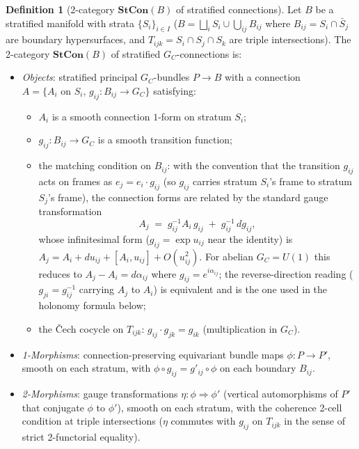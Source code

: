 \documentclass[11pt,a4paper]{article}
\theoremstyle{plain}
\theoremstyle{definition}
\newtheorem{definition}[theorem]{Definition}
\theoremstyle{remark}
\begin{document}
\begin{definition}[2-category $\mathbf{StCon}(B)$ of stratified connections]
\label{def:stcon}
Let $B$ be a stratified manifold with strata $\{S_i\}_{i \in I}$
($B = \bigsqcup_i S_i \cup \bigcup_{ij} B_{ij}$ where $B_{ij} = S_i \cap
\bar S_j$ are boundary hypersurfaces, and $T_{ijk} = S_i \cap S_j \cap
S_k$ are triple intersections). The 2-category $\mathbf{StCon}(B)$ of
stratified $G_C$-connections is:
\begin{itemize}[leftmargin=*,itemsep=2pt]
\item \emph{Objects}: stratified principal $G_C$-bundles $P \to B$ with
  a connection
  $A = \{A_i \text{ on } S_i, \, g_{ij} : B_{ij} \to G_C\}$ satisfying:
  \begin{itemize}
  \item[(O1)] $A_i$ is a smooth connection $1$-form on stratum $S_i$;
  \item[(O2)] $g_{ij} : B_{ij} \to G_C$ is a smooth transition function;
  \item[(O3)] the matching condition on $B_{ij}$: with the
    convention that the transition $g_{ij}$ acts on frames as
    $e_j = e_i \cdot g_{ij}$ (so $g_{ij}$ carries stratum $S_i$'s
    frame to stratum $S_j$'s frame), the connection forms are related
    by the standard gauge transformation
    \begin{equation}\label{eq:matching}
      A_j \;=\; g_{ij}^{-1} A_i\, g_{ij} \;+\; g_{ij}^{-1}\,
      d g_{ij},
    \end{equation}
    whose infinitesimal form ($g_{ij} = \exp u_{ij}$ near the
    identity) is
    $A_j = A_i + d u_{ij} + [A_i, u_{ij}] + O(u_{ij}^2)$.
    For abelian $G_C = U(1)$ this reduces to
    $A_j - A_i = d\alpha_{ij}$ where $g_{ij} = e^{i \alpha_{ij}}$;
    the reverse-direction reading ($g_{ji} = g_{ij}^{-1}$
    carrying $A_j$ to $A_i$) is equivalent and is the one used in
    the holonomy formula below;
  \item[(O4)] the Čech cocycle on $T_{ijk}$: $g_{ij} \cdot g_{jk} =
    g_{ik}$ (multiplication in $G_C$).
  \end{itemize}
\item \emph{1-Morphisms}: connection-preserving equivariant bundle maps
  $\phi : P \to P'$, smooth on each stratum, with $\phi \circ g_{ij} =
  g'_{ij} \circ \phi$ on each boundary $B_{ij}$.
\item \emph{2-Morphisms}: gauge transformations $\eta : \phi \Rightarrow
  \phi'$ (vertical automorphisms of $P'$ that conjugate $\phi$ to
  $\phi'$), smooth on each stratum, with the coherence 2-cell condition
  at triple intersections ($\eta$ commutes with $g_{ij}$ on $T_{ijk}$
  in the sense of strict 2-functorial equality).
\end{itemize}
\end{definition}
\end{document}
